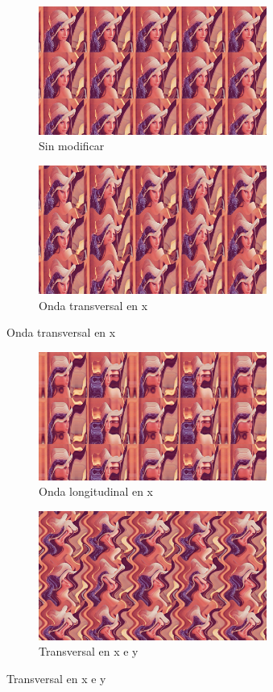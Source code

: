 \begin{figure}
	\centering
	\begin{subfigure}[b]{0.48\textwidth}
		\centering
		\includegraphics[width=7.5cm]{archivos/deformation1}
		\caption{Sin modificar}
	\end{subfigure}
	\begin{subfigure}[b]{0.48\textwidth}
		\centering
		\includegraphics[width=7.5cm]{archivos/deformation2}
		\caption{Onda transversal en x}
	\end{subfigure}
\end{figure}
\begin{figure}\ContinuedFloat
	\centering
	\begin{subfigure}[b]{0.48\textwidth}
		\centering
		\includegraphics[width=7.5cm]{archivos/deformation3}
		\caption{Onda longitudinal en x}
	\end{subfigure}
	\begin{subfigure}[b]{0.48\textwidth}
		\centering
		\includegraphics[width=7.5cm]{archivos/deformation4}
		\caption{Transversal en x e y}
	\end{subfigure}
\end{figure}
